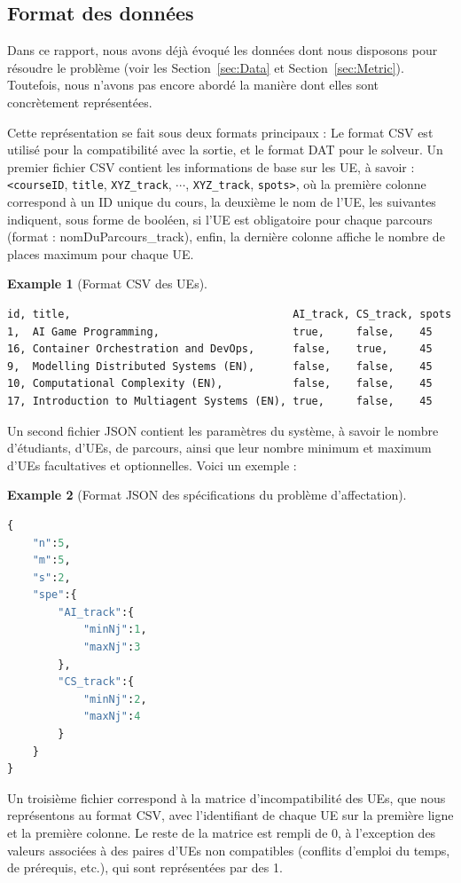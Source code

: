 \documentclass{rapport}
\theoremstyle{definition}
\theoremstyle{remark}
\theoremstyle{plain}
\newtheorem{example}{Example}
\theoremstyle{definition}
\theoremstyle{definition}
\theoremstyle{remark}
\theoremstyle{definition}
\begin{document}
\subsection{Format des données}
Dans ce rapport, nous avons déjà évoqué les données dont nous disposons pour résoudre le problème (voir les Section~\ref{sec:Data} et Section~\ref{sec:Metric}). Toutefois, nous n'avons pas encore abordé la manière dont elles sont concrètement représentées.

Cette représentation se fait sous deux formats principaux : Le format CSV est utilisé pour la compatibilité avec la sortie, et le format DAT pour le solveur.
Un premier fichier CSV contient les informations de base sur les UE, à savoir : \texttt{<courseID}, \texttt{title}, \texttt{XYZ\_track}, $\cdots$, \texttt{XYZ\_track}, \texttt{spots>}, où la première colonne correspond à un ID unique du cours, la deuxième le nom de l'UE,  les suivantes indiquent, sous forme de booléen, si l'UE est obligatoire pour chaque parcours (format : nomDuParcours\_track), enfin,  la dernière colonne affiche le nombre de places maximum pour chaque UE.

\begin{example}[Format CSV des UEs]\end{example}
\vspace{-\baselineskip}
\begin{verbatim}
id, title,                                   AI_track, CS_track, spots
1,  AI Game Programming,                     true,     false,    45
16, Container Orchestration and DevOps,      false,    true,     45
9,  Modelling Distributed Systems (EN),      false,    false,    45
10, Computational Complexity (EN),           false,    false,    45
17, Introduction to Multiagent Systems (EN), true,     false,    45
\end{verbatim}

Un second fichier JSON contient les paramètres du système, à savoir le nombre d'étudiants, d'UEs, de parcours, ainsi que leur nombre minimum et maximum d'UEs facultatives et optionnelles. Voici un exemple :
\begin{example}[Format JSON des spécifications du problème d'affectation]\end{example}
\vspace{-\baselineskip}
\begin{lstlisting}[language=python]
{
    "n":5,
    "m":5,
    "s":2,
    "spe":{
        "AI_track":{
            "minNj":1,
            "maxNj":3
        },
        "CS_track":{
            "minNj":2,
            "maxNj":4
        }
    }
}
\end{lstlisting}
Un troisième fichier correspond à la matrice d'incompatibilité des UEs, que nous représentons au format CSV, avec l'identifiant de chaque UE sur la première ligne et la première colonne. Le reste de la matrice est rempli de 0, à l'exception des valeurs associées à des paires d'UEs non compatibles (conflits d'emploi du temps, de prérequis, etc.), qui sont représentées par des 1.
\end{document}
